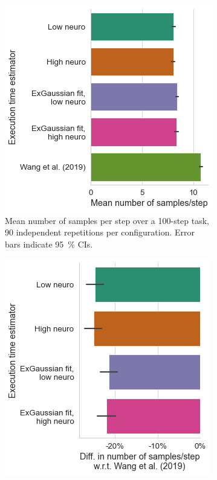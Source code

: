 \begin{figure}
    \centering
    \begin{subfigure}[]{\columnwidth}
        \centering
        \includegraphics[width=.9\textwidth]{figs/new_model/sampling_junjue.png}
        \caption{%
            Mean number of samples per step over a \num{100}-step task, \num{90} independent repetitions per configuration.
            Error bars indicate \SI{95}{\percent} \acp{CI}.
        }
    \end{subfigure}
    \begin{subfigure}[]{\columnwidth}
        \centering
        \includegraphics[width=.9\textwidth]{figs/new_model/diff_sampling_junjue.png}

\end{subfigure}
\end{figure}
